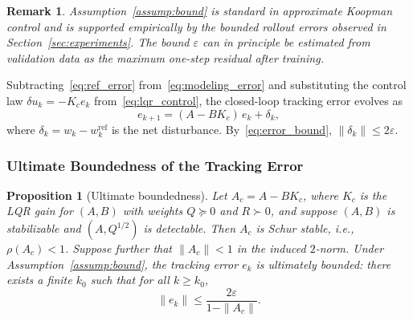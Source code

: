 \documentclass[journal]{IEEEtran}
\newtheorem{proposition}{Proposition}
\newtheorem{remark}{Remark}
\begin{document}
\begin{remark}
Assumption~\ref{assump:bound} is standard in approximate Koopman control \cite{strasser2026overview} and is supported empirically by the bounded rollout errors observed in Section~\ref{sec:experiments}. The bound $\varepsilon$ can in principle be estimated from validation data as the maximum one-step residual after training.
\end{remark}

Subtracting~\eqref{eq:ref_error} from~\eqref{eq:modeling_error} and substituting the control law $\delta u_k = -K_c e_k$ from~\eqref{eq:lqr_control}, the closed-loop tracking error evolves as
\begin{equation}
    e_{k+1} = (A - BK_c)\,e_k + \delta_k,
    \label{eq:error_dynamics}
\end{equation}
where $\delta_k = w_k - w_k^{\mathrm{ref}}$ is the net disturbance. By~\eqref{eq:error_bound}, $\|\delta_k\| \leq 2\varepsilon$.

\subsubsection{Ultimate Boundedness of the Tracking Error}

\begin{proposition}[Ultimate boundedness]
\label{prop:ub}
Let $A_c = A - BK_c$, where $K_c$ is the LQR gain for $(A,B)$ with weights $Q \succeq 0$ and $R \succ 0$, and suppose $(A,B)$ is stabilizable and $(A,Q^{1/2})$ is detectable. Then $A_c$ is Schur stable, i.e., $\rho(A_c) < 1$. Suppose further that $\|A_c\| < 1$ in the induced $2$-norm. Under Assumption~\ref{assump:bound}, the tracking error $e_k$ is ultimately bounded: there exists a finite $k_0$ such that for all $k \geq k_0$,
\begin{equation}
    \|e_k\| \leq \frac{2\varepsilon}{1 - \|A_c\|}.
    \label{eq:ub_bound}
\end{equation}
\end{proposition}
\end{document}
